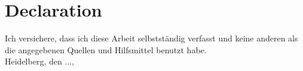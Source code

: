 \section*{Declaration}

Ich versichere, dass ich diese Arbeit selbstst\"{a}ndig verfasst und keine
anderen als die angegebenen Quellen und Hilfsmittel benutzt habe.
\\

Heidelberg, den ...,

